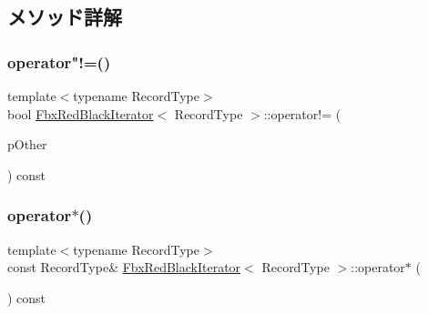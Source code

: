 \subsection{メソッド詳解}
\mbox{\label{class_fbx_red_black_iterator_aba270c5ac15573fed0c92a9dae6b94bc}} 
\subsubsection{\texorpdfstring{operator"!=()}{operator!=()}}
{\footnotesize\ttfamily template$<$typename Record\+Type$>$ \\
bool \hyperlink{class_fbx_red_black_iterator}{Fbx\+Red\+Black\+Iterator}$<$ Record\+Type $>$\+::operator!= (\begin{DoxyParamCaption}\item[{const \hyperlink{class_fbx_red_black_iterator}{Fbx\+Red\+Black\+Iterator}$<$ Record\+Type $>$ \&}]{p\+Other }\end{DoxyParamCaption}) const}

\mbox{\label{class_fbx_red_black_iterator_ae8a4c3c275647234641fb62d71f00130}} 
\subsubsection{\texorpdfstring{operator$\ast$()}{operator*()}\hspace{0.1cm}{\footnotesize\ttfamily [1/2]}}
{\footnotesize\ttfamily template$<$typename Record\+Type$>$ \\
const Record\+Type\& \hyperlink{class_fbx_red_black_iterator}{Fbx\+Red\+Black\+Iterator}$<$ Record\+Type $>$\+::operator$\ast$ (\begin{DoxyParamCaption}{ }\end{DoxyParamCaption}) const}

\mbox{\label{class_fbx_red_black_iterator_a1f8632b341af30d1f92665e3a9206faf}} 
